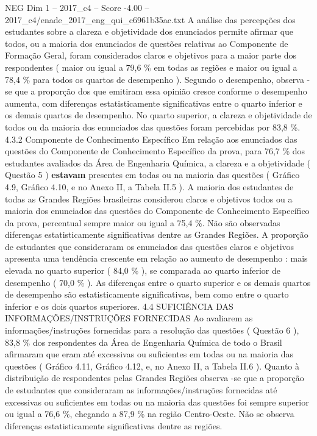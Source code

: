 \begin{textsample}{NEG Dim 1 – 2017\_c4 – Score -4.00 – 2017\_c4/enade\_2017\_eng\_qui\_c6961b35ac.txt}
A análise das percepções dos estudantes sobre a clareza e objetividade dos enunciados permite afirmar que todos, ou a maioria dos enunciados de questões relativas ao Componente de Formação Geral, foram considerados claros e objetivos para a maior parte dos respondentes ( maior ou igual a 79,6 \% em todas as regiões e maior ou igual a 78,4 \% para todos os quartos de desempenho ).
Segundo o desempenho, observa -se que a proporção dos que emitiram essa opinião cresce conforme o desempenho aumenta, com diferenças estatisticamente significativas entre o quarto inferior e os demais quartos de desempenho.
No quarto superior, a clareza e objetividade de todos ou da maioria dos enunciados das questões foram percebidas por 83,8 \%. 4.3.2 Componente de Conhecimento Específico Em relação aos enunciados das questões do Componente de Conhecimento Específico da prova, para 76,7 \% dos estudantes avaliados da Área de Engenharia Química, a clareza e a objetividade ( Questão 5 ) \textbf{estavam} presentes em todas ou na maioria das questões ( Gráfico 4.9, Gráfico 4.10, e no Anexo II, a Tabela II.5 ).
A maioria dos estudantes de todas as Grandes Regiões brasileiras considerou claros e objetivos todos ou a maioria dos enunciados das questões do Componente de Conhecimento Específico da prova, percentual sempre maior ou igual a 75,4 \%.
Não são observadas diferenças estatisticamente significativas dentre as Grandes Regiões.
A proporção de estudantes que consideraram os enunciados das questões claros e objetivos apresenta uma tendência crescente em relação ao aumento de desempenho : mais elevada no quarto superior ( 84,0 \% ), se comparada ao quarto inferior de desempenho ( 70,0 \% ).
As diferenças entre o quarto superior e os demais quartos de desempenho são estatisticamente significativas, bem como entre o quarto inferior e os dois quartos superiores. 4.4 SUFICIÊNCIA DAS INFORMAÇÕES/INSTRUÇÕES FORNECIDAS Ao avaliarem as informações/instruções fornecidas para a resolução das questões ( Questão 6 ), 83,8 \% dos respondentes da Área de Engenharia Química de todo o Brasil afirmaram que eram até excessivas ou suficientes em todas ou na maioria das questões ( Gráfico 4.11, Gráfico 4.12, e, no Anexo II, a Tabela II.6 ).
Quanto à distribuição de respondentes pelas Grandes Regiões observa -se que a proporção de estudantes que consideraram as informações/instruções fornecidas até excessivas ou suficientes em todas ou na maioria das questões foi sempre superior ou igual a 76,6 \%, chegando a 87,9 \% na região Centro-Oeste.
Não se observa diferenças estatisticamente significativas dentre as regiões.

\end{textsample}
